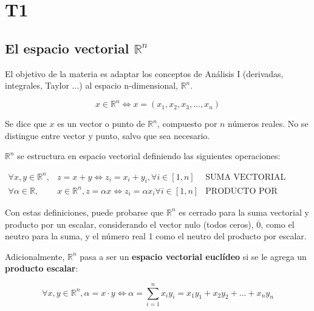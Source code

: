 \documentclass{article}
\renewcommand{\Bbb}{\mathbb}
\begin{document}
 


\section{T1}

\subsection{El espacio vectorial $\Bbb R^n$}

El objetivo de la materia es adaptar los conceptos de Análisis I (derivadas, integrales, Taylor ...) al espacio n-dimensional, $\mathbb{R}^n$.

\begin{equation}
x \in \Bbb R^n \Longleftrightarrow x = (x_1, x_2, x_3, ..., x_n)
\end{equation}

Se dice que $x$ es un vector o punto de $\Bbb R^n$, compuesto por $n$ números reales. No se distingue entre vector y punto, salvo que sea necesario.

$\Bbb R^n$ se estructura en espacio vectorial definiendo las siguientes operaciones:

\begin{subequations}
\begin{align}
\forall x, y \in \Bbb R^n, & z = x + y \Longleftrightarrow z_i = x_i + y_i, \forall i \in [1, n] & \text{SUMA VECTORIAL}\\
\forall \alpha \in \Bbb R, & x \in \Bbb R^n, z = \alpha x \Longleftrightarrow z_i = \alpha x_i \forall i \in [1, n] & \text{PRODUCTO POR ESCALAR}
\end{align}
\end{subequations}

Con estas definiciones, puede probarse que $\Bbb R^n$ es cerrado para la suma vectorial y producto por un escalar, considerando el vector nulo (todos ceros), $\overline{0}$, como el neutro para la suma, y el número real 1 como el neutro del producto por escalar.

Adicionalmente, $\Bbb R^n$ pasa a ser un \textbf{espacio vectorial euclídeo} si se le agrega un \textbf{producto escalar}:

\begin{equation}
\forall x, y \in \Bbb R^n, \alpha = x \cdot y \Longleftrightarrow \alpha = \sum_{i=1}^{n} x_i y_i = x_1 y_1 + x_2 y_2 + ... + x_n y_n
\end{equation}
\end{document}
